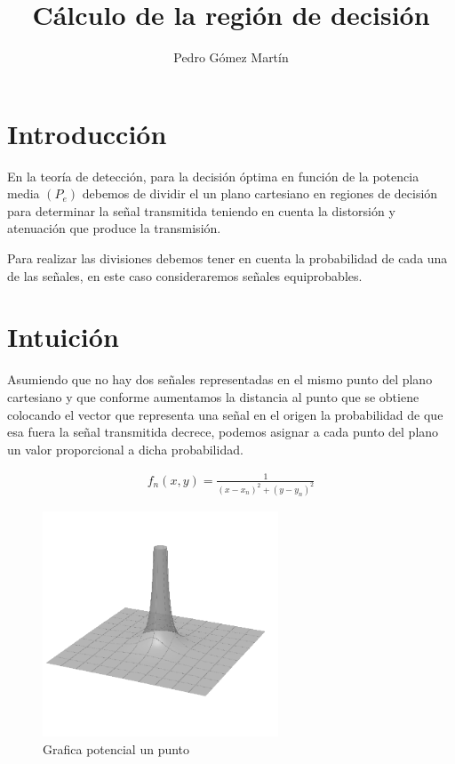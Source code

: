 \documentclass{article}
\title{Cálculo de la región de decisión}
\author{Pedro Gómez Martín}
\begin{document}
\maketitle

\section{Introducción}
En la teoría de detección, para la decisión óptima en función de la
potencia media $(P_e)$ debemos de dividir el un plano cartesiano en
regiones de decisión para determinar la señal transmitida teniendo
en cuenta la distorsión y atenuación que produce la transmisión.

Para realizar las divisiones debemos tener en cuenta la probabilidad
de cada una de las señales, en este caso consideraremos señales
equiprobables.

\section{Intuición}
Asumiendo que no hay dos señales representadas en el mismo punto del
plano cartesiano y que conforme aumentamos la distancia al punto que
se obtiene colocando el vector que representa una señal en el origen
la probabilidad de que esa fuera la señal transmitida decrece, podemos
asignar a cada punto del plano un valor proporcional a dicha
probabilidad.

\begin{align}
  \label{eq:intuition}
  f_n(x,y) = \frac{1}{\left( x - x_n \right)^2 + \left( y - y_n \right)^2  }
\end{align}

\begin{figure}[H]
  \centering
  \includegraphics[width=7cm]{./media/potencial_punto.png}
  \caption{Grafica potencial un punto}
  \label{fig:potential1}
\end{figure}
\end{document}
